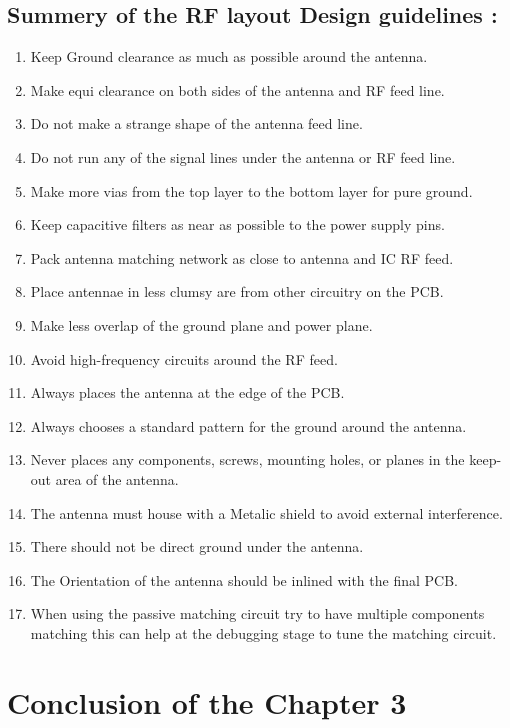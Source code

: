 \subsection{Summery of the RF layout Design guidelines :}
\begin{enumerate}
	\item Keep Ground clearance as much as possible around the antenna.
	\item Make equi clearance on both sides of the antenna and RF feed line.
	\item Do not make a strange shape of the antenna feed line.
	\item Do not run any of the signal lines under the antenna or RF feed line.
	\item Make more vias from the top layer to the bottom layer for pure ground.
	\item Keep capacitive filters as near as possible to the power supply pins.
	\item Pack antenna matching network as close to antenna and IC RF feed.
	\item Place antennae in less clumsy are from other circuitry on the PCB.
	\item Make less overlap of the ground plane and power plane.
	\item Avoid high-frequency circuits around the RF feed.
	\item Always places the antenna at the edge of the PCB.
	\item Always chooses a standard pattern for the ground around the antenna.
	\item Never places any components, screws, mounting holes, or planes in the keep-out area of the antenna.
	\item The antenna must house with a Metalic shield to avoid external interference.
	\item There should not be direct ground under the antenna.
	\item The Orientation of the antenna should be inlined with the final PCB.
	\item When using the passive matching circuit try to have multiple components matching this can help at the debugging stage to tune the matching circuit.
\end{enumerate}

\section{Conclusion of the Chapter 3}